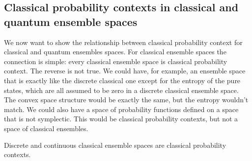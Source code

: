 \subsection{Classical probability contexts in classical and quantum ensemble spaces}

We now want to show the relationship between classical probability context for classical and quantum ensembles spaces. For classical ensemble spaces the connection is simple: every classical ensemble space is classical probability context. The reverse is not true. We could have, for example, an ensemble space that is exactly like the discrete classical one except for the entropy of the pure states, which are all assumed to be zero in a discrete classical ensemble space. The convex space structure would be exactly the same, but the entropy wouldn't match. We could also have a space of probability functions defined on a space that is not symplectic. This would be classical probability contexts, but not a space of classical ensembles.

\begin{conj}
	Discrete and continuous classical ensemble spaces are classical probability contexts.
\end{conj}

	

